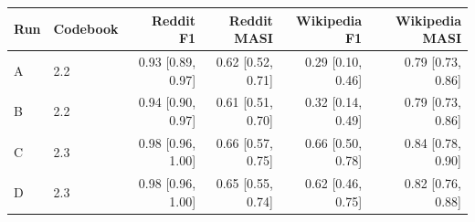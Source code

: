 \begin{tabular}{llrrrr}
\toprule
Run & Codebook & Reddit F1 & Reddit MASI & Wikipedia F1 & Wikipedia MASI \\
\midrule
A & 2.2 & 0.93 [0.89, 0.97] & 0.62 [0.52, 0.71] & 0.29 [0.10, 0.46] & 0.79 [0.73, 0.86] \\
B & 2.2 & 0.94 [0.90, 0.97] & 0.61 [0.51, 0.70] & 0.32 [0.14, 0.49] & 0.79 [0.73, 0.86] \\
\midrule
C & 2.3 & 0.98 [0.96, 1.00] & 0.66 [0.57, 0.75] & 0.66 [0.50, 0.78] & 0.84 [0.78, 0.90] \\
D & 2.3 & 0.98 [0.96, 1.00] & 0.65 [0.55, 0.74] & 0.62 [0.46, 0.75] & 0.82 [0.76, 0.88] \\
\bottomrule
\end{tabular}
